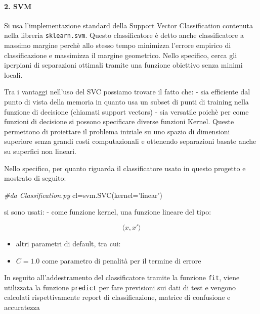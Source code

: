 \documentclass[11pt]{article}
\providecommand{\tightlist}{%
      \setlength{\itemsep}{0pt}\setlength{\parskip}{0pt}}
\newenvironment{Shaded}{}{}
\newcommand{\StringTok}[1]{\textcolor[rgb]{0.25,0.44,0.63}{{#1}}}
\newcommand{\CommentTok}[1]{\textcolor[rgb]{0.38,0.63,0.69}{\textit{{#1}}}}
\newcommand{\NormalTok}[1]{{#1}}
\newcommand{\OperatorTok}[1]{\textcolor[rgb]{0.40,0.40,0.40}{{#1}}}
\begin{document}
    \paragraph{2. SVM}\label{svm}

    Si usa l'implementazione standard della Support Vector Classification
contenuta nella libreria \texttt{sklearn.svm}. Questo classificatore è
detto anche classificatore a massimo margine perchè allo stesso tempo
minimizza l'errore empirico di classificazione e massimizza il margine
geometrico. Nello specifico, cerca gli iperpiani di separazioni ottimali
tramite una funzione obiettivo senza minimi locali.

Tra i vantaggi nell'uso del SVC possiamo trovare il fatto che: - sia
efficiente dal punto di vista della memoria in quanto usa un subset di
punti di training nella funzione di decisione (chiamati support vectors)
- sia versatile poichè per come funzioni di decisione si possono
specificare diverse funzioni Kernel. Queste permettono di proiettare il
problema iniziale su uno spazio di dimensioni superiore senza grandi
costi computazionali e ottenendo separazioni basate anche su superfici
non lineari.

Nello specifico, per quanto riguarda il classificatore usato in questo
progetto e mostrato di seguito:

\begin{Shaded}
\begin{Highlighting}[]
\CommentTok{#da Classification.py}
\NormalTok{cl}\OperatorTok{=}\NormalTok{svm.SVC(kernel}\OperatorTok{=}\StringTok{'linear'}\NormalTok{)    }
\end{Highlighting}
\end{Shaded}

si sono usati: - come funzione kernel, una funzione lineare del tipo:

\begin{equation*}
    \langle x, x'\rangle
    \end{equation*}

\begin{itemize}
\tightlist
\item
  altri parametri di default, tra cui:
\item
  \(C=1.0\) come parametro di penalità per il termine di errore
\end{itemize}

In seguito all'addestramento del classificatore tramite la funzione
\texttt{fit}, viene utilizzata la funzione \texttt{predict} per fare
previsioni sui dati di test e vengono calcolati rispettivamente report
di classificazione, matrice di confusione e accuratezza
\end{document}
